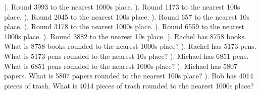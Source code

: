 \documentclass{article}%
\begin{document}
\newline%
). Round 3993 to the nearest 1000s place.%
\newline%
\newline%
). Round 1173 to the nearest 100s place.%
\newline%
\newline%
). Round 2045 to the nearest 100s place.%
\newline%
\newline%
). Round 657 to the nearest 10s place.%
\newline%
\newline%
). Round 3178 to the nearest 1000s place.%
\newline%
\newline%
). Round 6559 to the nearest 1000s place.%
\newline%
\newline%
). Round 3882 to the nearest 10s place.%
\newline%
\newline%
). Rachel has 8758 books. What is 8758 books rounded to the nearest 1000s place?%
\newline%
\newline%
). Rachel has 5173 pens. What is 5173 pens rounded to the nearest 10s place?%
\newline%
\newline%
). Michael has 6851 pens. What is 6851 pens rounded to the nearest 1000s place?%
\newline%
\newline%
). Michael has 5807 papers. What is 5807 papers rounded to the nearest 100s place?%
\newline%
\newline%
). Bob has 4014 pieces of trash. What is 4014 pieces of trash rounded to the nearest 1000s place?%
\newline%
\newline%
\newline%
\end{document}
